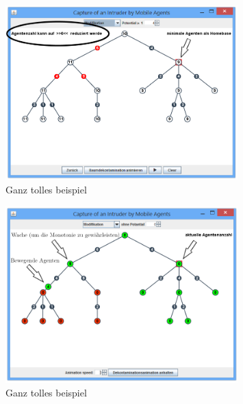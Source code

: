 \begin{figure}[hb]
	\includegraphics[width=0.8\textwidth]{bilder/abb_erklaerung3.png} 
	\captionsetup{width=0.8\textwidth}
	\caption{Ganz tolles beispiel}
	\label{abb_erklaerung1}
\end{figure}
\begin{figure}[hb]
	\includegraphics[width=0.8\textwidth]{bilder/abb_erklaerung4.png} 
	\captionsetup{width=0.8\textwidth}
	\caption{Ganz tolles beispiel}
	\label{abb_erklaerung1}
\end{figure}


